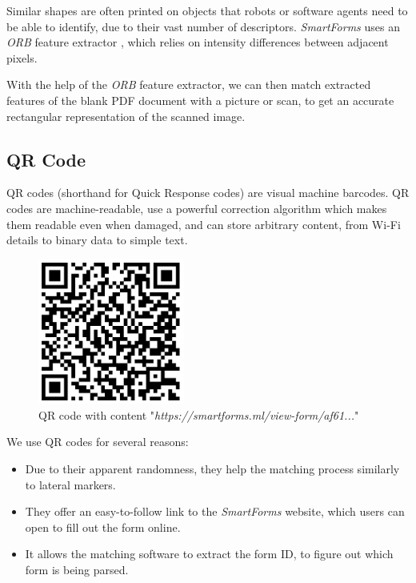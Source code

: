 \documentclass[11pt, a4paper]{report}
\begin{document}
Similar shapes are often printed on objects that robots or software agents need to be able to identify, due to their vast number of descriptors. \textit{SmartForms} uses an \textit{ORB} feature extractor \cite{rublee2011orb}, which relies on intensity differences between adjacent pixels.

With the help of the \textit{ORB} feature extractor, we can then match extracted features of the blank PDF document with a picture or scan, to get an accurate rectangular representation of the scanned image.

\subsection{QR Code}

QR codes (shorthand for Quick Response codes) are visual machine barcodes. QR codes are machine-readable, use a powerful correction algorithm \cite{wicker1999reed} which makes them readable even when damaged, and can store arbitrary content, from Wi-Fi details to binary data to simple text.

\begin{figure}[!h]
    \centering
    \includegraphics[width=13em]{images/screenshoots/sample-qr-code.png}
    \caption{QR code with content "\textit{https://smartforms.ml/view-form/af61...}"}
    \label{qr-code-image}
\end{figure}

We use QR codes for several reasons:
\begin{itemize}
    \item Due to their apparent randomness, they help the matching process similarly to lateral markers.
    \item They offer an easy-to-follow link to the \textit{SmartForms} website, which users can open to fill out the form online.
    \item It allows the matching software to extract the form ID, to figure out which form is being parsed.
\end{itemize}
\end{document}
